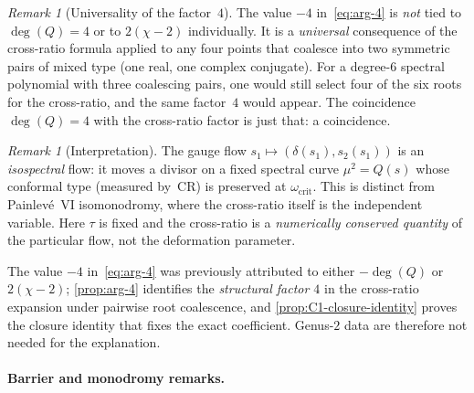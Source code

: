 \documentclass[11pt,a4paper]{article}
\theoremstyle{plain}
\theoremstyle{definition}
\theoremstyle{remark}
\newtheorem{remark}[theorem]{Remark}
\begin{document}
\begin{remark}[Universality of the factor~$4$]
The value $-4$ in~\eqref{eq:arg-4} is
\emph{not} tied to $\deg(Q) = 4$ or to $2(\chi - 2)$
individually.  It is a \emph{universal} consequence of the
cross-ratio formula applied to any four points that coalesce
into two symmetric pairs of mixed type (one real, one complex
conjugate).  For a degree-$6$ spectral polynomial with three
coalescing pairs, one would still select four of the six roots
for the cross-ratio, and the same factor~$4$ would appear.
The coincidence $\deg(Q) = 4$ with the cross-ratio factor is just
that: a coincidence.
\end{remark}

\begin{remark}[Interpretation]
\label{rem:isospectral}
The gauge flow $s_1 \mapsto (\delta(s_1), s_2(s_1))$ is an
\emph{isospectral} flow: it moves a divisor on a fixed spectral
curve $\mu^2 = Q(s)$ whose conformal type (measured by~$\mathrm{CR}$)
is preserved at $\omega_{\mathrm{crit}}$.
This is distinct from Painlev\'e~VI isomonodromy, where the
cross-ratio itself is the independent variable.  Here $\tau$ is
fixed and the cross-ratio is a \emph{numerically conserved quantity} of the
particular flow, not the deformation parameter.

The value $-4$ in~\eqref{eq:arg-4} was previously attributed to
either $-\deg(Q)$ or $2(\chi - 2)$;
\cref{prop:arg-4} identifies the \emph{structural factor $4$} in the
cross-ratio expansion under pairwise root coalescence, and
\cref{prop:C1-closure-identity} proves the closure identity that fixes
the exact coefficient.  Genus-$2$ data are therefore not needed
for the explanation.
\end{remark}

\paragraph{Barrier and monodromy remarks.}
\end{document}

